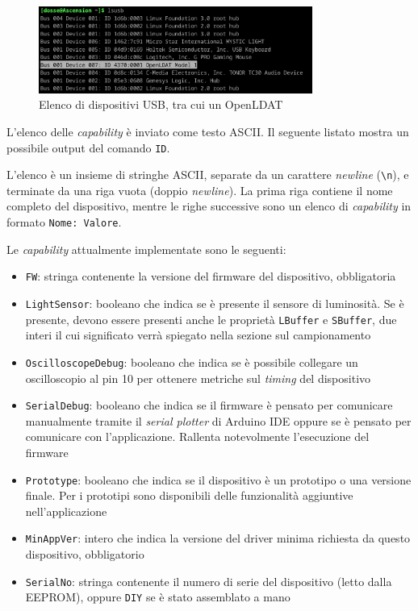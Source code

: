 \begin{figure}[h]
	\centering
	\includegraphics[width=0.8\textwidth]{Dispositivo_files/lsusb.png}
	\caption{Elenco di dispositivi USB, tra cui un OpenLDAT}
	\label{fig:lsusb}
\end{figure}

L'elenco delle \textit{capability} è inviato come testo ASCII. Il seguente listato mostra un possibile output del comando \texttt{ID}.

L'elenco è un insieme di stringhe ASCII, separate da un carattere \textit{newline} (\texttt{\textbackslash n}), e terminate da una riga vuota (doppio \textit{newline}). La prima riga contiene il nome completo del dispositivo, mentre le righe successive sono un elenco di \textit{capability} in formato \texttt{Nome: Valore}.

Le \textit{capability} attualmente implementate sono le seguenti:
\begin{itemize}
	\item \texttt{FW}: stringa contenente la versione del firmware del dispositivo, obbligatoria
	\item \texttt{LightSensor}: booleano che indica se è presente il sensore di luminosità. Se è presente, devono essere presenti anche le proprietà \texttt{LBuffer} e \texttt{SBuffer}, due interi il cui significato verrà spiegato nella sezione sul campionamento
	\item \texttt{OscilloscopeDebug}: booleano che indica se è possibile collegare un oscilloscopio al pin 10 per ottenere metriche sul \textit{timing} del dispositivo
	\item \texttt{SerialDebug}: booleano che indica se il firmware è pensato per comunicare manualmente tramite il \textit{serial plotter} di Arduino IDE oppure se è pensato per comunicare con l'applicazione. Rallenta notevolmente l'esecuzione del firmware
	\item \texttt{Prototype}: booleano che indica se il dispositivo è un prototipo o una versione finale. Per i prototipi sono disponibili delle funzionalità aggiuntive nell'applicazione
	\item \texttt{MinAppVer}: intero che indica la versione del driver minima richiesta da questo dispositivo, obbligatorio
	\item \texttt{SerialNo}: stringa contenente il numero di serie del dispositivo (letto dalla EEPROM), oppure \texttt{DIY} se è stato assemblato a mano
\end{itemize}

